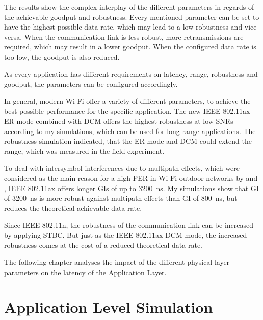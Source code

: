 \documentclass[]{nsm-thesis}
\begin{document}
The results show the complex interplay of the different parameters in regards of the achievable goodput and robustness.
Every mentioned parameter can be set to have the highest possible data rate, which may lead to a low robustness and vice versa.
When the communication link is less robust, more retransmissions are required, which may result in a lower goodput.
When the configured data rate is too low, the goodput is also reduced.

As every application has different requirements on
latency, range, robustness and goodput, the parameters can be configured accordingly.

In general, modern Wi-Fi offer a variety of different parameters, to achieve the best possible performance for the specific application.
The new IEEE 802.11ax \ac{ER} mode combined with \ac{DCM} offers the highest robustness at low \ac{SNR}s according to my simulations, which can
be used for long range applications.
The robustness simulation indicated, that the \ac{ER} mode and \ac{DCM} could extend the range, which was measured in the field experiment.

To deal with intersymbol interferences due to multipath effects, which were considered as the main reason for a high \ac{PER} in  Wi-Fi outdoor networks by
\cite{sheth_packet_2007} and \cite{aguayo_link-level_2004}, IEEE 802.11ax offers longer \ac{GI}s of up to \SI{3200}{\nano\second}.
My simulations show that \ac{GI} of \SI{3200}{\nano\second} is more robust against multipath effects than \ac{GI} of \SI{800}{\nano\second}, but
reduces the theoretical achievable data rate.

Since IEEE 802.11n, the robustness of the communication link can be increased by applying \ac{STBC}.
But just as the IEEE 802.11ax \ac{DCM} mode, the
increased robustness comes at the cost of a reduced theoretical data rate.

The following chapter analyses the impact of the different physical layer parameters on the latency of the Application Layer.

\chapter{Application Level Simulation}
\end{document}
